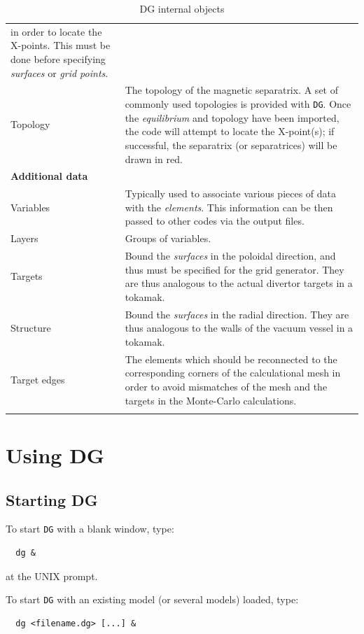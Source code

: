 \documentclass[a4paper,10pt]{report}
\begin{document}
\begin{center}
\begin{longtable}{|l|p{12cm}|}
in order to locate the X-points.
This must be done before specifying {\it surfaces} or
{\it grid points}.
 \\
Topology
 &
The topology of the magnetic separatrix.  A set of commonly used topologies
is provided with {\tt DG}.  Once the {\it equilibrium} and topology have been
imported, the code will attempt to locate the X-point(s); if successful, the
separatrix (or separatrices) will be drawn in red.
 \\
{\bf Additional data}&    \\
Variables           &
Typically used to associate various pieces of data with the {\it elements}.
This information can be then passed to
other codes via the output files.
 \\

Layers
 &
Groups of variables.
 \\

Targets
 &
Bound the {\it surfaces} in the poloidal direction, and thus must be
specified for the grid generator.  They are thus analogous to the
actual divertor targets in a tokamak.
 \\
Structure
&
Bound the {\it surfaces} in the radial direction.  They are thus
analogous to the walls of the vacuum vessel in a tokamak.
\\
Target edges
&
The elements which should be reconnected to the corresponding corners
of the calculational mesh in order to avoid mismatches of the mesh
and the targets in the Monte-Carlo calculations. \\
    \hline
    \caption{DG internal objects}
    \label{tab:dginternalobjects}
  \end{longtable}
\end{center}


\section{Using DG}

\subsection{Starting DG}

To start {\tt DG} with a blank window, type:
\begin{verbatim}
  dg &
\end{verbatim}
at the UNIX prompt.

To start {\tt DG} with an existing model (or several models) loaded, type:
\begin{verbatim}
  dg <filename.dg> [...] &
\end{verbatim}
\end{document}
